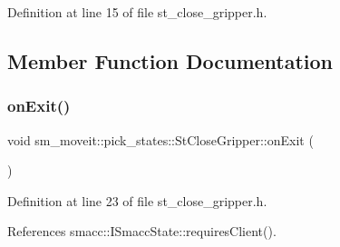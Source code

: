 Definition at line 15 of file st\+\_\+close\+\_\+gripper.\+h.



\subsection{Member Function Documentation}
\mbox{\label{structsm__moveit_1_1pick__states_1_1StCloseGripper_aaa0ec979ec47ffea358d2375c1ed0910}} 
\subsubsection{\texorpdfstring{on\+Exit()}{onExit()}}
{\footnotesize\ttfamily void sm\+\_\+moveit\+::pick\+\_\+states\+::\+St\+Close\+Gripper\+::on\+Exit (\begin{DoxyParamCaption}{ }\end{DoxyParamCaption})\hspace{0.3cm}{\ttfamily [inline]}}



Definition at line 23 of file st\+\_\+close\+\_\+gripper.\+h.



References smacc\+::\+I\+Smacc\+State\+::requires\+Client().



